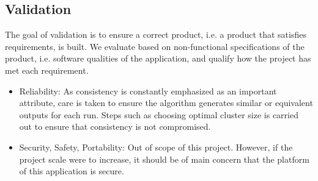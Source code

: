 \documentclass[12pt]{article}
\begin{document}
\newpage

\subsection {Validation}
The goal of validation is to ensure a correct product, i.e. a product that satisfies requirements, is built.
We evaluate based on non-functional specifications of the product, i.e. software qualities of the
application, and qualify how the project has met each requirement.
\begin{itemize}
\item Reliability: As consistency is constantly emphasized as an important attribute, care is taken
to ensure the algorithm generates similar or equivalent outputs for each run. Steps such as choosing
optimal cluster size is carried out to ensure that consistency is not compromised.
\item Security, Safety, Portability: Out of scope of this project. However, 
if the project scale were to increase, it should be of main concern that the
 platform of this application is secure.
\end{itemize}
\end{document}
